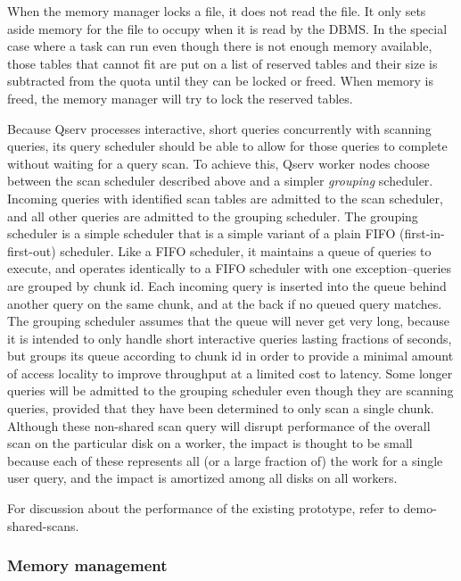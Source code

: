 \documentclass[DM,lsstdraft,toc]{lsstdoc}
\begin{document}
When the memory manager locks a file, it does not read the file. It only
sets aside memory for the file to occupy when it is read by the DBMS. In
the special case where a task can run even though there is not enough
memory available, those tables that cannot fit are put on a list of
reserved tables and their size is subtracted from the quota until they
can be locked or freed. When memory is freed, the memory manager will
try to lock the reserved tables.

Because Qserv processes interactive, short queries concurrently with
scanning queries, its query scheduler should be able to allow for those
queries to complete without waiting for a query scan. To achieve this,
Qserv worker nodes choose between the scan scheduler described above and
a simpler \emph{grouping} scheduler. Incoming queries with identified
scan tables are admitted to the scan scheduler, and all other queries
are admitted to the grouping scheduler. The grouping scheduler is a
simple scheduler that is a simple variant of a plain FIFO
(first-in-first-out) scheduler. Like a FIFO scheduler, it maintains a
queue of queries to execute, and operates identically to a FIFO
scheduler with one exception--queries are grouped by chunk id. Each
incoming query is inserted into the queue behind another query on the
same chunk, and at the back if no queued query matches. The grouping
scheduler assumes that the queue will never get very long, because it is
intended to only handle short interactive queries lasting fractions of
seconds, but groups its queue according to chunk id in order to provide
a minimal amount of access locality to improve throughput at a limited
cost to latency. Some longer queries will be admitted to the grouping
scheduler even though they are scanning queries, provided that they have
been determined to only scan a single chunk. Although these non-shared
scan query will disrupt performance of the overall scan on the
particular disk on a worker, the impact is thought to be small because
each of these represents all (or a large fraction of) the work for a
single user query, and the impact is amortized among all disks on all
workers.

For discussion about the performance of the existing prototype, refer to
demo-shared-scans.

\subsubsection{Memory management}\label{shared-scan-memory-management}
\end{document}

